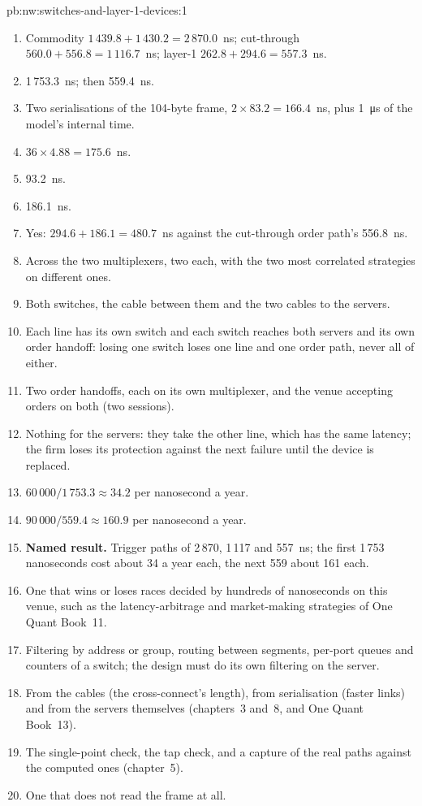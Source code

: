 \begin{solution}{pb:nw:switches-and-layer-1-devices:1}
\begin{enumerate}
\item Commodity $1\,439.8 + 1\,430.2 = 2\,870.0$~ns; cut-through $560.0 + 556.8 = 1\,116.7$~ns; layer-1 $262.8 + 294.6 = 557.3$~ns.
\item 1\,753.3~ns; then 559.4~ns.
\item Two serialisations of the 104-byte frame, $2 \times 83.2 = 166.4$~ns, plus \qty{1}{\micro\second} of the model's internal time.
\item $36 \times 4.88 = 175.6$~ns.
\item 93.2~ns.
\item 186.1~ns.
\item Yes: $294.6 + 186.1 = 480.7$~ns against the cut-through order path's 556.8~ns.
\item Across the two multiplexers, two each, with the two most correlated strategies on different ones.
\item Both switches, the cable between them and the two cables to the servers.
\item Each line has its own switch and each switch reaches both servers and its own order handoff: losing one switch loses one
  line and one order path, never all of either.
\item Two order handoffs, each on its own multiplexer, and the venue accepting orders on both (two sessions).
\item Nothing for the servers: they take the other line, which has the same latency; the firm loses its protection against the next
  failure until the device is replaced.
\item $60\,000 / 1\,753.3 \approx 34.2$ per nanosecond a year.
\item $90\,000 / 559.4 \approx 160.9$ per nanosecond a year.
\item \textbf{Named result.} Trigger paths of 2\,870, 1\,117 and 557~ns; the first 1\,753 nanoseconds cost about 34 a year each, the
  next 559 about 161 each.
\item One that wins or loses races decided by hundreds of nanoseconds on this venue, such as the latency-arbitrage and market-making
  strategies of One Quant Book~11.
\item Filtering by address or group, routing between segments, per-port queues and counters of a switch; the design must do its own
  filtering on the server.
\item From the cables (the cross-connect's length), from serialisation (faster links) and from the servers themselves (chapters~3
  and~8, and One Quant Book~13).
\item The single-point check, the tap check, and a capture of the real paths against the computed ones (chapter~5).
\item One that does not read the frame at all.
\end{enumerate}
\end{solution}

